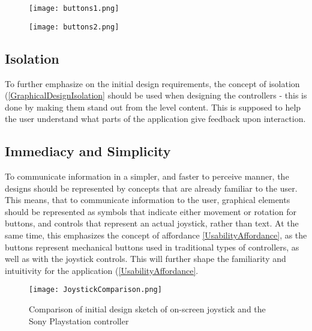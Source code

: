 \begin{figure}[H]
\centering
\begin{minipage}{.5\textwidth}
  \centering
  \texttt{[image: buttons1.png]}
\end{minipage}%
\begin{minipage}{.5\textwidth}
  \centering
  \texttt{[image: buttons2.png]}
\end{minipage}
\end{figure}


\subsection{Isolation}
To further emphasize on the initial design requirements, the concept of isolation (\ref{GraphicalDesignIsolation} should be used when designing the controllers - this is done by making them stand out from the level content. This is supposed to help the user understand what parts of the application give feedback upon interaction.

\subsection{Immediacy and Simplicity}
To communicate information in a simpler, and faster to perceive manner, the designs should be represented by concepts that are already familiar to the user. This means, that to communicate information to the user, graphical elements should be represented as symbols that indicate either movement or rotation for buttons, and controls that represent an actual joystick, rather than
text. At the same time, this emphasizes the concept of affordance \ref{UsabilityAffordance}, as the buttons represent	mechanical buttons used in traditional types of controllers, as well as with the joystick controls. This will further shape the familiarity and intuitivity for the application (\ref{UsabilityAffordance}.

\begin{figure}[H]
\centering
\texttt{[image: JoystickComparison.png]}
\caption{Comparison of initial design sketch of on-screen joystick and the Sony Playstation controller}
\end{figure}

